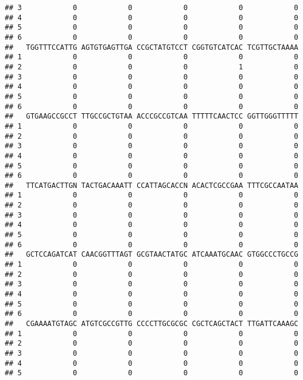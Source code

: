 \documentclass[]{article}
\begin{document}
\begin{verbatim}
## 3            0            0            0            0            0
## 4            0            0            0            0            0
## 5            0            0            0            0            0
## 6            0            0            0            0            0
##   TGGTTTCCATTG AGTGTGAGTTGA CCGCTATGTCCT CGGTGTCATCAC TCGTTGCTAAAA
## 1            0            0            0            0            0
## 2            0            0            0            1            0
## 3            0            0            0            0            0
## 4            0            0            0            0            0
## 5            0            0            0            0            0
## 6            0            0            0            0            0
##   GTGAAGCCGCCT TTGCCGCTGTAA ACCCGCCGTCAA TTTTTCAACTCC GGTTGGGTTTTT
## 1            0            0            0            0            0
## 2            0            0            0            0            0
## 3            0            0            0            0            0
## 4            0            0            0            0            0
## 5            0            0            0            0            0
## 6            0            0            0            0            0
##   TTCATGACTTGN TACTGACAAATT CCATTAGCACCN ACACTCGCCGAA TTTCGCCAATAA
## 1            0            0            0            0            0
## 2            0            0            0            0            0
## 3            0            0            0            0            0
## 4            0            0            0            0            0
## 5            0            0            0            0            0
## 6            0            0            0            0            0
##   GCTCCAGATCAT CAACGGTTTAGT GCGTAACTATGC ATCAAATGCAAC GTGGCCCTGCCG
## 1            0            0            0            0            0
## 2            0            0            0            0            0
## 3            0            0            0            0            0
## 4            0            0            0            0            0
## 5            0            0            0            0            0
## 6            0            0            0            0            0
##   CGAAAATGTAGC ATGTCGCCGTTG CCCCTTGCGCGC CGCTCAGCTACT TTGATTCAAAGC
## 1            0            0            0            0            0
## 2            0            0            0            0            0
## 3            0            0            0            0            0
## 4            0            0            0            0            0
## 5            0            0            0            0            0

\end{verbatim}
\end{document}
